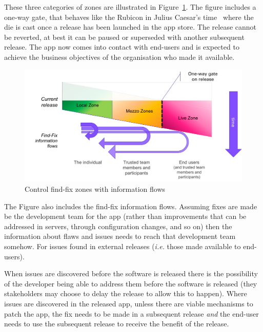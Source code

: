 These three categories of zones are illustrated in Figure~\ref{fig:my:control-find-fix-zones-with-information-flows}. The figure includes a one-way gate, that behaves like the Rubicon in Julius Caesar's time~ where the die is cast once a release has been launched in the app store. The release cannot be reverted, at best it can be paused or superseded with another subsequent release. The app now comes into contact with end-users and is expected to achieve the business objectives of the organisation who made it available.

\begin{figure}
    \includegraphics[width=\linewidth]{images/my/control-find-fix-zones-with-information-flows.pdf}
    \caption{Control find-fix zones with information flows}
    \label{fig:my:control-find-fix-zones-with-information-flows}
\end{figure}

The Figure also includes the find-fix information flows. Assuming fixes are made be the development team for the app (rather than improvements that can be addressed in servers, through configuration changes, and so on) then the information about flaws and issues needs to reach that development team somehow. For issues found in external releases (\emph{i.e.} those made available to end-users).

When issues are discovered before the software is released there is the possibility of the developer being able to address them before the software is released (they stakeholders may choose to delay the release to allow this to happen). Where issues are discovered in the released app, unless there are viable mechanisms to patch the app, the fix needs to be made in a subsequent release \textit{and} the end-user needs to use the subsequent release to receive the benefit of the release.

